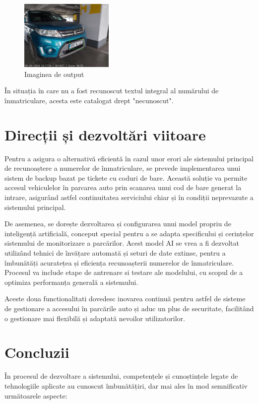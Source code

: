 \documentclass[a4paper,12pt]{report}
\begin{document}
\begin{figure}[h]
    \centering
    \includegraphics[width=0.4\textwidth]{images/output.jpg}
    \caption{Imaginea de output}
\end{figure}
\FloatBarrier

În situația în care nu a fost recunoscut textul integral al numărului de înmatriculare, acesta este catalogat drept "necunoscut".

\section*{Direcții și dezvoltări viitoare}
Pentru a asigura o alternativă eficientă în cazul unor erori ale sistemului principal de recunoaștere a numerelor de înmatriculare, se prevede implementarea unui sistem de backup bazat pe tickete cu coduri de bare. Această soluție va permite accesul vehiculelor în parcarea auto prin scanarea unui cod de bare generat la intrare, asigurând astfel continuitatea serviciului chiar și în condiții neprevazute a sistemului principal.

De asemenea, se dorește dezvoltarea și configurarea unui model propriu de inteligență artificială, conceput special pentru a se adapta specificului și cerințelor sistemului de monitorizare a parcărilor. Acest model AI se vrea a fi dezvoltat utilizând tehnici de învățare automată și seturi de date extinse, pentru a îmbunătăți acuratețea și eficiența recunoașterii numerelor de înmatriculare. Procesul va include etape de antrenare si testare ale modelului, cu scopul de a optimiza performanța generală a sistemului.

Aceste doua functionalitati dovedesc inovarea continuă pentru astfel de sisteme de gestionare a accesului în parcările auto și aduc un plus de securitate, facilitând o gestionare mai flexibilă și adaptată nevoilor utilizatorilor.

\section*{Concluzii}
În procesul de dezvoltare a sistemului, competențele și cunoștințele legate de tehnologiile aplicate au cunoscut îmbunătățiri, dar mai ales în mod semnificativ următoarele aspecte:
\end{document}
